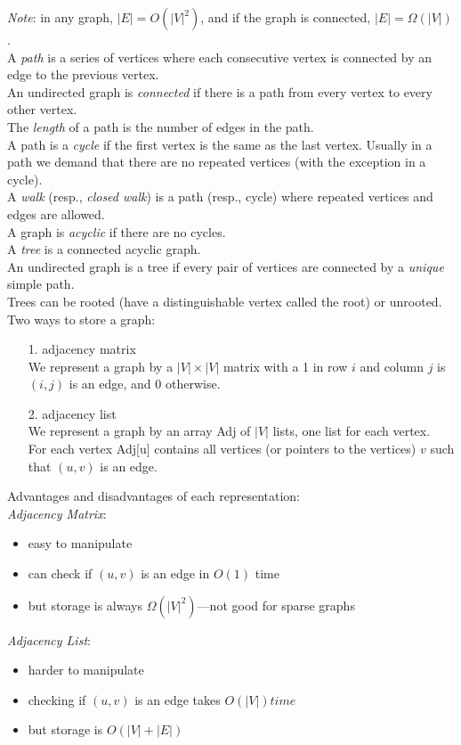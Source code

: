 \documentclass[12pt]{article}
\theoremstyle{plain}
\theoremstyle{definition}
\newcommand{\lecture}[1]{\marginpar{{\footnotesize $\leftarrow$ \underline{#1}}}}
\begin{document}
\emph{Note}: in any graph, $|E| = O(|V|^{2})$, and if the graph is connected, $|E| = \Omega(|V|)$. \\

A \emph{path} is a series of vertices where each consecutive vertex is connected by an edge to the previous vertex. \\
An undirected graph is \emph{connected} if there is a path from every vertex to every other vertex. \\
The \emph{length} of a path is the number of edges in the path. \\
A path is a \emph{cycle} if the first vertex is the same as the last vertex.
Usually in a path we demand that there are no repeated vertices (with the exception in a cycle). \\
A \emph{walk} (resp., \emph{closed walk}) is a path (resp., cycle) where repeated vertices and edges are allowed. \\
A graph is \emph{acyclic} if there are no cycles. \\

A \emph{tree} is a connected acyclic graph. \\
An undirected graph is a tree if every pair of vertices are connected by a \emph{unique} simple path. \\
Trees can be rooted (have a distinguishable vertex called the root) or unrooted. \\

Two ways to store a graph:
\begin{itemize}
  \item[1.] adjacency matrix \\
  We represent a graph by a $|V| \times |V|$ matrix with a 1 in row $i$ and column $j$ is $(i, j)$ is an edge, and 0 otherwise. \\
  \item[2.] adjacency list \\
  We represent a graph by an array Adj of $|V|$ lists, one list for each vertex. \\
  For each vertex Adj[u] contains all vertices (or pointers to the vertices) $v$ such that $(u, v)$ is an edge.
\end{itemize}

Advantages and disadvantages of each representation: \\
\emph{Adjacency Matrix}:
\begin{itemize}
  \item easy to manipulate
  \item can check if $(u, v)$ is an edge in $O(1)$ time
  \item but storage is always $\Omega(|V|^{2})$---not good for sparse graphs
\end{itemize}

\emph{Adjacency List}:
\begin{itemize}
  \item harder to manipulate
  \item checking if $(u, v)$ is an edge takes $O(|V|) time$
  \item but storage is $O(|V| + |E|)$
\end{itemize}

\lecture{November 3, 2016}



\clearpage
\printindex
\end{document}
